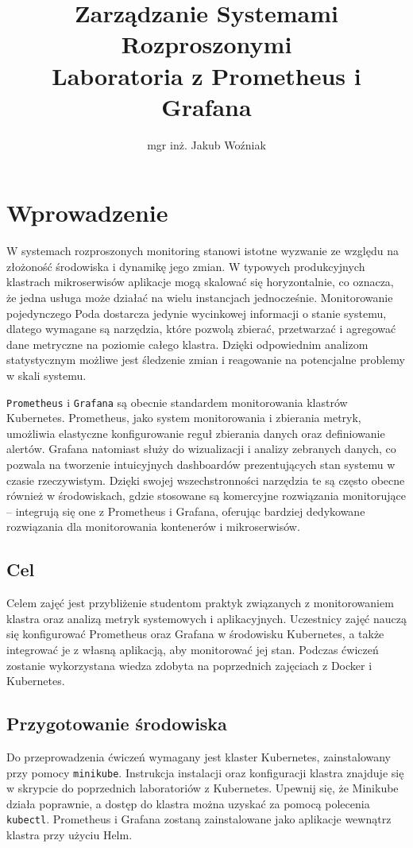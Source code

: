 \documentclass{article}
\title{Zarządzanie Systemami Rozproszonymi\\Laboratoria z Prometheus i Grafana}
\author{mgr inż. Jakub Woźniak}
\date{}
\begin{document}
\maketitle

\section{Wprowadzenie}
W systemach rozproszonych monitoring stanowi istotne wyzwanie ze względu na złożoność środowiska i dynamikę jego zmian. W typowych produkcyjnych klastrach mikroserwisów aplikacje mogą skalować się horyzontalnie, co oznacza, że jedna usługa może działać na wielu instancjach jednocześnie. Monitorowanie pojedynczego Poda dostarcza jedynie wycinkowej informacji o stanie systemu, dlatego wymagane są narzędzia, które pozwolą zbierać, przetwarzać i agregować dane metryczne na poziomie całego klastra. Dzięki odpowiednim analizom statystycznym możliwe jest śledzenie zmian i reagowanie na potencjalne problemy w skali systemu.

\texttt{Prometheus} i \texttt{Grafana} są obecnie standardem monitorowania klastrów Kubernetes. Prometheus, jako system monitorowania i zbierania metryk, umożliwia elastyczne konfigurowanie reguł zbierania danych oraz definiowanie alertów. Grafana natomiast służy do wizualizacji i analizy zebranych danych, co pozwala na tworzenie intuicyjnych dashboardów prezentujących stan systemu w czasie rzeczywistym. Dzięki swojej wszechstronności narzędzia te są często obecne również w środowiskach, gdzie stosowane są komercyjne rozwiązania monitorujące – integrują się one z Prometheus i Grafana, oferując bardziej dedykowane rozwiązania dla monitorowania kontenerów i mikroserwisów.

\subsection{Cel}
Celem zajęć jest przybliżenie studentom praktyk związanych z monitorowaniem klastra oraz analizą metryk systemowych i aplikacyjnych. Uczestnicy zajęć nauczą się konfigurować Prometheus oraz Grafana w środowisku Kubernetes, a także integrować je z własną aplikacją, aby monitorować jej stan. Podczas ćwiczeń zostanie wykorzystana wiedza zdobyta na poprzednich zajęciach z Docker i Kubernetes.

\subsection{Przygotowanie środowiska}
Do przeprowadzenia ćwiczeń wymagany jest klaster Kubernetes, zainstalowany przy pomocy \texttt{minikube}. Instrukcja instalacji oraz konfiguracji klastra znajduje się w skrypcie do poprzednich laboratoriów z Kubernetes. Upewnij się, że Minikube działa poprawnie, a dostęp do klastra można uzyskać za pomocą polecenia \texttt{kubectl}. Prometheus i Grafana zostaną zainstalowane jako aplikacje wewnątrz klastra przy użyciu Helm.
\end{document}
